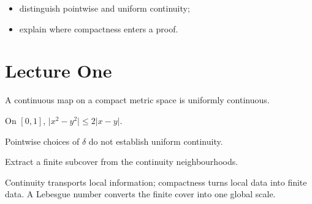 \documentclass[11pt]{scrartcl}
\begin{document}
\SynapticMakeTitle
\begin{synlearninggoals}
  \begin{itemize}
    \item distinguish pointwise and uniform continuity;
    \item explain where compactness enters a proof.
  \end{itemize}
\end{synlearninggoals}
\section{Lecture One}
\begin{syntheorem}[Continuity]
  A continuous map on a compact metric space is uniformly continuous.
\end{syntheorem}
\begin{synexample}
  On $[0,1]$, $\lvert x^2-y^2\rvert\leq 2\lvert x-y\rvert$.
\end{synexample}
\begin{synwarning}
  Pointwise choices of $\delta$ do not establish uniform continuity.
\end{synwarning}
\begin{synexercise}[Try it]
  Extract a finite subcover from the continuity neighbourhoods.
\end{synexercise}
\begin{synlecturesummary}
  Continuity transports local information; compactness turns local data into
  finite data. A Lebesgue number converts the finite cover into one global scale.
\end{synlecturesummary}
\end{document}
